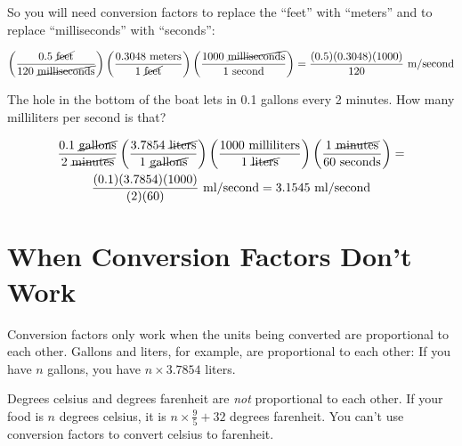 So you will need conversion factors to replace the ``feet'' with ``meters'' and to replace ``milliseconds'' with ``seconds'':

\begin{multline*}
\left(\frac{0.5 \text{ \cancel{feet}}}{120 \text{ \cancel{milliseconds}}}\right) \left( \frac{0.3048 \text{ meters}}{1 \text{ \cancel{feet}}} \right) \left( \frac{ 1000 \text{ \cancel{milliseconds}}} {1 \text{ second}}\right) = \frac{(0.5)(0.3048)(1000)}{120}\text{ m/second}
\end{multline*}

\begin{Exercise}[title={Conversion Factors}, label=conversion_factors]

The hole in the bottom of the boat lets in 0.1 gallons every 2 minutes.  How many milliliters per second is that?

\end{Exercise}
\begin{Answer}[ref=conversion_factors]

  \begin{multline*}
    \frac{0.1 \text{ \cancel{gallons}}}{2 \text{ \cancel{minutes}}}
  \left( \frac{3.7854 \text{ \cancel{liters}}}{1 \text{ \cancel{gallons}}} \right)
  \left( \frac{1000 \text{ milliliters}}{1\text{ \cancel{liters}}}\right)
  \left( \frac{1 \text{ \cancel{minutes}}}{60 \text{ seconds}} \right) = \\
  \frac{(0.1)(3.7854)(1000)}{(2)(60)} \text{ ml/second} = 3.1545 \text{ ml/second}
  \end{multline*}

\end{Answer}

\section{When Conversion Factors Don't Work}

Conversion factors only work when the units being converted are
proportional to each other. Gallons and liters, for example, are
proportional to each other: If you have $n$ gallons, you have $n
\times 3.7854$ liters.

Degrees celsius and degrees farenheit are \textit{not} proportional to
each other.  If your food is $n$ degrees celsius, it is $n \times
\frac{9}{5} + 32$ degrees farenheit.  You can't use conversion factors
to convert celsius to farenheit.
